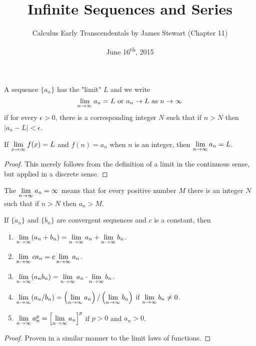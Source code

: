 \documentclass[a4paper,8pt]{article}
\title{Infinite Sequences and Series}
\author{Calculus Early Transcendentals by James Stewart (Chapter 11)}
\date{June 16\textsuperscript{th}, 2015}
\begin{document}
\maketitle
{}

\begin{outline}

    A sequence \(\{a_n\}\) has the "limit" \(L\) and we write
    \[ \lim\limits_{n\rightarrow \infty^{}}a_n = L \text{ or } a_n \rightarrow L\text{ as } n \rightarrow \infty \]
    if for every \(\epsilon > 0\), there is a corresponding integer \(N\) such that if \(n > N\)
    then \(|a_n - L| < \epsilon\).

    If \(\lim\limits_{x\rightarrow \infty^{}} f(x) = L\) and \(f(n) = a_n\) when \(n\) is an integer, then \(\lim\limits_{n\rightarrow \infty^{}} a_n = L\).

    \begin{proof}
      This merely follows from the definition of a limit in the continuous sense, but applied in a discrete sense.
    \end{proof}

    The \(\lim\limits_{n\rightarrow \infty^{}}a_n = \infty\) means that for every positive number \(M\) there is an integer \(N\) such that if \(n > N\)
    then \(a_n > M\).

    If \(\{a_n\}\) and \(\{b_n\}\) are convergent sequences and \(c\) is a constant, then
    \begin{enumerate}
      \item \(\lim\limits_{n\rightarrow \infty^{}} (a_n + b_n) = \lim\limits_{n\rightarrow \infty^{}} a_n + \lim\limits_{n\rightarrow \infty^{}} b_n\).
      \item \(\lim\limits_{n\rightarrow \infty^{}} ca_n = c \lim\limits_{n\rightarrow \infty^{}}a_n\).
      \item \(\lim\limits_{n\rightarrow \infty^{}} (a_nb_n) = \lim\limits_{n\rightarrow \infty^{}} a_n \cdot \lim\limits_{n\rightarrow \infty^{}} b_n\).
      \item \(\lim\limits_{n\rightarrow \infty^{}} (a_n/b_n) = \left(\lim\limits_{n\rightarrow \infty^{}}a_n\right)/\left(\lim\limits_{n\rightarrow \infty^{}}b_n\right)\) if \(\lim\limits_{n\rightarrow \infty^{}}b_n \neq 0\).
      \item \(\lim\limits_{n\rightarrow \infty^{}} a_n^p = \left[\lim\limits_{n\rightarrow \infty^{}}a_n\right]^p\) if \(p > 0\) and \(a_n > 0\).
    \end{enumerate}

    \begin{proof}
      Proven in a similar manner to the limit laws of functions.
    \end{proof}


\end{outline}
\end{document}
